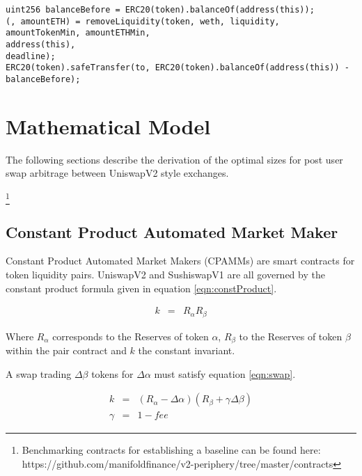 \documentclass[runningheads]{llncs}
\begin{document}
\begin{verbatim}
uint256 balanceBefore = ERC20(token).balanceOf(address(this));
(, amountETH) = removeLiquidity(token, weth, liquidity, amountTokenMin, amountETHMin, 
address(this), 
deadline);
ERC20(token).safeTransfer(to, ERC20(token).balanceOf(address(this)) - balanceBefore);
\end{verbatim}

\newpage
	
\chapter{Mathematical Model}


    
	
	The following sections describe the derivation of the optimal sizes for post user swap arbitrage between UniswapV2 style exchanges.
	
	\footnote{Benchmarking contracts for establishing a baseline can be found here: https://github.com/manifoldfinance/v2-periphery/tree/master/contracts }
	
	

	
	\section{Constant Product Automated Market Maker}
	Constant Product Automated Market Makers (CPAMMs) are smart contracts for token liquidity pairs. UniswapV2 and SushiswapV1 are all governed by the constant product formula given in equation \ref{eqn:constProduct}. 
	
	\begin{eqnarray}
		k  &=& R_{\alpha}  R_{\beta}  \label{eqn:constProduct}
	\end{eqnarray}
	
	Where \(R_{\alpha}\) corresponds to the Reserves of token \(\alpha\), \(R_{\beta}\) to the Reserves of token \(\beta\) within the pair contract and \( k \) the constant invariant. 
	
	A swap trading \( \Delta\beta\) tokens for \( \Delta\alpha \) must satisfy equation \ref{eqn:swap}.
	
	\begin{eqnarray}
		k  &=& (R_{\alpha} - \Delta\alpha)  (R_{\beta} + \gamma\Delta\beta ) \label{eqn:swap}\\
		\gamma  &=& 1 - fee \label{eqn:gamma}
	\end{eqnarray}
	
\end{document}
